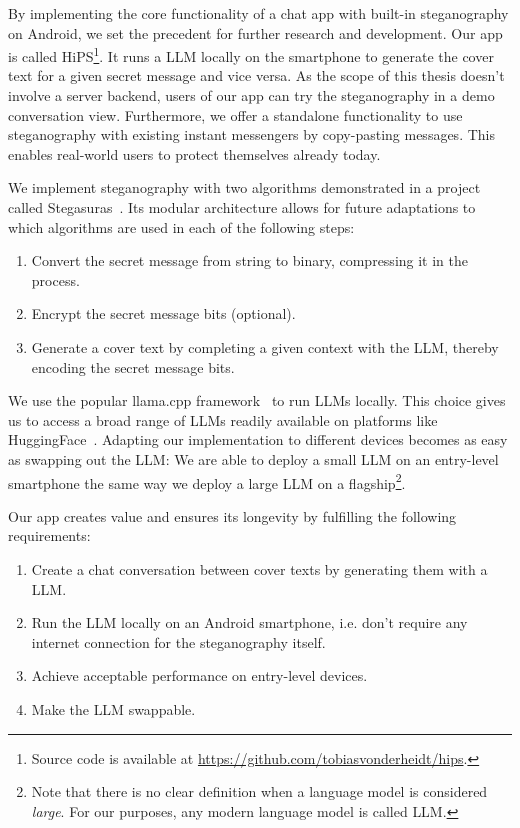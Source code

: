 By implementing the core functionality of a chat app with built-in steganography on Android, we set the precedent for further research and development. Our app is called \gls{HiPS}\footnote{Source code is available at \url{https://github.com/tobiasvonderheidt/hips}.}. It runs a \gls{LLM} locally on the smartphone to generate the cover text for a given secret message and vice versa. As the scope of this thesis doesn't involve a server backend, users of our app can try the steganography in a demo conversation view. Furthermore, we offer a standalone functionality to use steganography with existing instant messengers by copy-pasting messages. This enables real-world users to protect themselves already today.

We implement steganography with two algorithms demonstrated in a project called Stegasuras~\cite{zieglerNeuralLinguisticSteganography2019}. Its modular architecture allows for future adaptations to which algorithms are used in each of the following steps:

\begin{enumerate}
    \item Convert the secret message from string to binary, compressing it in the process.
    \item Encrypt the secret message bits (optional).
    \item Generate a cover text by completing a given context with the \gls{LLM}, thereby encoding the secret message bits.
\end{enumerate}

We use the popular llama.cpp framework~\cite{gerganovGgerganovLlamacpp2024} to run \glspl{LLM} locally. This choice gives us to access a broad range of \glspl{LLM} readily available on platforms like HuggingFace~\cite{huggingfaceModelsHuggingFace2025}. Adapting our implementation to different devices becomes as easy as swapping out the \gls{LLM}: We are able to deploy a small \gls{LLM} on an entry-level smartphone the same way we deploy a large \gls{LLM} on a flagship\footnote{Note that there is no clear definition when a language model is considered \textit{large}. For our purposes, any modern language model is called \gls{LLM}.}.

Our app creates value and ensures its longevity by fulfilling the following requirements:

\begin{enumerate}
    \item Create a chat conversation between cover texts by generating them with a \gls{LLM}.
    \item Run the \gls{LLM} locally on an Android smartphone, i.e. don't require any internet connection for the steganography itself.
    \item Achieve acceptable performance on entry-level devices.
    \item Make the \gls{LLM} swappable.
\end{enumerate}

